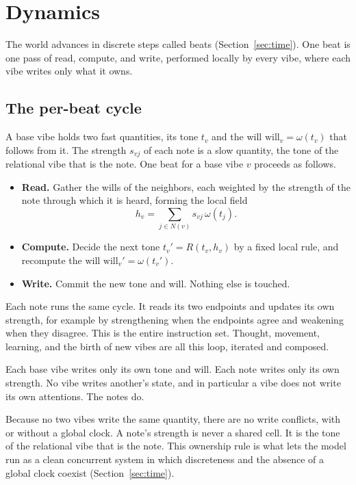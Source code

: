 \section{Dynamics}
\label{sec:dynamics}

The world advances in discrete steps called beats (Section~\ref{sec:time}). One beat is one pass of read, compute, and write, performed locally by every vibe, where each vibe writes only what it owns.

\subsection{The per-beat cycle}

A base vibe holds two fast quantities, its tone $t_v$ and the will $\mathrm{will}_v = \omega(t_v)$ that follows from it. The strength $s_{vj}$ of each note is a slow quantity, the tone of the relational vibe that is the note. One beat for a base vibe $v$ proceeds as follows.

\begin{itemize}
\item \textbf{Read.} Gather the wills of the neighbors, each weighted by the strength of the note through which it is heard, forming the local field
\[
h_v = \sum_{j \in N(v)} s_{vj}\, \omega(t_j).
\]
\item \textbf{Compute.} Decide the next tone $t_v' = R(t_v, h_v)$ by a fixed local rule, and recompute the will $\mathrm{will}_v' = \omega(t_v')$.
\item \textbf{Write.} Commit the new tone and will. Nothing else is touched.
\end{itemize}

Each note runs the same cycle. It reads its two endpoints and updates its own strength, for example by strengthening when the endpoints agree and weakening when they disagree. This is the entire instruction set. Thought, movement, learning, and the birth of new vibes are all this loop, iterated and composed.

\begin{proposition}[Ownership]
Each base vibe writes only its own tone and will. Each note writes only its own strength. No vibe writes another's state, and in particular a vibe does not write its own attentions. The notes do.
\end{proposition}

Because no two vibes write the same quantity, there are no write conflicts, with or without a global clock. A note's strength is never a shared cell. It is the tone of the relational vibe that is the note. This ownership rule is what lets the model run as a clean concurrent system in which discreteness and the absence of a global clock coexist (Section~\ref{sec:time}).

